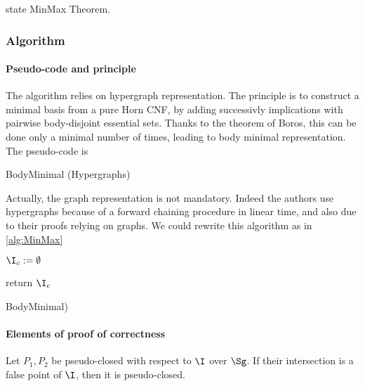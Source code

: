 state MinMax Theorem.

\subsubsection{Algorithm}

\paragraph{Pseudo-code and principle}

The algorithm relies on hypergraph representation. The principle is to construct
a minimal basis from a pure Horn CNF, by adding successivly implications with 
pairwise body-disjoint essential sets. Thanks to the theorem of Boros, this can
be done only a minimal number of times, leading to body minimal representation.
The pseudo-code is 

\begin{algorithm}
	
\caption{BodyMinimal (Hypergraphs)}
\label{alg:MinMaxHyp}
\end{algorithm}

\noindent Actually, the graph representation is not mandatory. Indeed the 
authors use hypergraphs because of a forward chaining procedure in linear time,
and also due to their proofs relying on graphs. We could rewrite this algorithm
as in \ref{alg:MinMax}

\begin{algorithm}[H]

\BlankLine
\BlankLine

$\I_c := \emptyset$ \;

return $\I_c$ \;	

\caption{BodyMinimal)}
\label{alg:MinMax}
\end{algorithm}	

\paragraph{Elements of proof of correctness}

\begin{proposition} \label{prop:let.pc_inter}
 Let $P_1, P_2$ be pseudo-closed with respect to $\I$ over 
$\Sg$. If their intersection is a false point of $\I$, then it is pseudo-closed.
	
\end{proposition}

